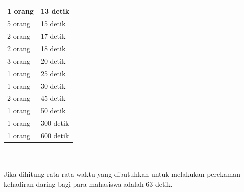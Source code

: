 \documentclass[a4paper,twoside]{article}
\begin{document}
\begin{enumerate}
\begin{enumerate}
\begin{tabular}{|p{4cm} |p{7cm}|}
				1 orang &  13 detik\\ \hline 
				5 orang &  15 detik\\ \hline 
				2 orang &  17 detik\\ \hline 
				2 orang &  18 detik\\ \hline 
				3 orang &  20 detik\\ \hline
				1 orang &  25 detik\\ \hline 
				1 orang &  30 detik\\ \hline 
				2 orang &  45 detik\\ \hline
				1 orang &  50 detik\\ \hline 
				1 orang &  300 detik\\ \hline 
				1 orang &  600 detik\\ \hline
			\end{tabular}\\ \\
			Jika dihitung rata-rata waktu yang dibutuhkan untuk melakukan perekaman kehadiran daring bagi para mahasiswa adalah 63 detik.
			

\end{enumerate}
\end{enumerate}
\end{document}
